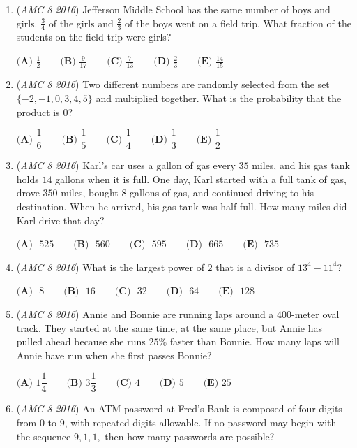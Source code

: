 \begin{enumerate}
	\item (\textit{AMC 8 2016}) Jefferson Middle School has the same number of boys and girls. $\frac{3}{4}$ of the girls and $\frac{2}{3}$
of the boys went on a field trip. What fraction of the students on the field trip were girls?


 $\textbf{(A) }\frac{1}{2}\qquad\textbf{(B) }\frac{9}{17}\qquad\textbf{(C) }\frac{7}{13}\qquad\textbf{(D) }\frac{2}{3}\qquad \textbf{(E) }\frac{14}{15}$


	\item (\textit{AMC 8 2016}) Two different numbers are randomly selected from the set $\{ - 2, -1, 0, 3, 4, 5\}$ and multiplied together. What is the probability that the product is $0$?


 $\textbf{(A) }\dfrac{1}{6}\qquad\textbf{(B) }\dfrac{1}{5}\qquad\textbf{(C) }\dfrac{1}{4}\qquad\textbf{(D) }\dfrac{1}{3}\qquad \textbf{(E) }\dfrac{1}{2}$


	\item (\textit{AMC 8 2016}) Karl's car uses a gallon of gas every $35$ miles, and his gas tank holds $14$ gallons when it is full. One day, Karl started with a full tank of gas, 
drove $350$ miles, bought $8$ gallons of gas, and continued driving to his destination. When he arrived, his gas tank was half full. How many miles did Karl drive that day? 


 $\textbf{(A)}\mbox{ }525\qquad\textbf{(B)}\mbox{ }560\qquad\textbf{(C)}\mbox{ }595\qquad\textbf{(D)}\mbox{ }665\qquad\textbf{(E)}\mbox{ }735$


	\item (\textit{AMC 8 2016}) What is the largest power of $2$ that is a divisor of $13^4 - 11^4$?


 $\textbf{(A)}\mbox{ }8\qquad \textbf{(B)}\mbox{ }16\qquad \textbf{(C)}\mbox{ }32\qquad \textbf{(D)}\mbox{ }64\qquad \textbf{(E)}\mbox{ }128$


	\item (\textit{AMC 8 2016}) Annie and Bonnie are running laps around a $400$-meter oval track. They started at the same time, at the same place, but Annie has pulled ahead because she runs $25\%$ faster than Bonnie. How many laps will Annie have run when she first passes Bonnie?


 $\textbf{(A) }1\dfrac{1}{4}\qquad\textbf{(B) }3\dfrac{1}{3}\qquad\textbf{(C) }4\qquad\textbf{(D) }5\qquad \textbf{(E) }25$


	\item (\textit{AMC 8 2016}) An ATM password at Fred's Bank is composed of four digits from $0$ to $9$, with repeated digits allowable. If no password may begin with the sequence $9,1,1,$ then how many passwords are possible?



\end{enumerate}
